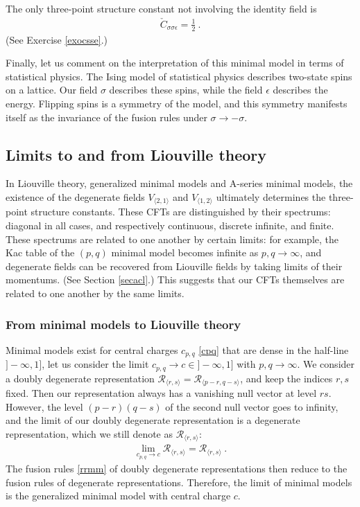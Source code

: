 \documentclass[12pt, a4paper, notitlepage, twoside]{report}
\numberwithin{equation}{section}
\theoremstyle{break}
\begin{document}
The only three-point structure constant not involving the identity field is 
\begin{align}
 \check{C}_{\sigma\sigma\epsilon} =\frac12\ .
\label{csse}
\end{align}
(See Exercise \ref{exocsse}.)

Finally, let us comment on the interpretation of this minimal model in terms of statistical physics.
The Ising model of statistical physics describes two-state spins on a lattice.
Our field $\sigma$ describes these spins, while the field $\epsilon$ describes the energy.
Flipping spins is a symmetry of the model, and this symmetry manifests itself as the invariance of the fusion rules under $\sigma\to -\sigma$. 

\subsection{Limits to and from Liouville theory}\label{secltf}

In Liouville theory, generalized minimal models and A-series minimal models, the existence of the degenerate fields $V_{\langle 2,1\rangle}$ and $V_{\langle 1,2\rangle}$ ultimately determines the three-point structure constants. These CFTs are distinguished by their spectrums: diagonal in all cases, and respectively continuous, discrete infinite, and finite. These spectrums are related to one another by certain limits: for example, the Kac table of the $(p, q)$ minimal model becomes infinite as $p,q\to \infty$, and degenerate fields can be recovered from Liouville fields by taking limits of their momentums. (See Section \ref{secacl}.) This suggests that our CFTs themselves are related to one another by the same limits. 

\subsubsection{From minimal models to Liouville theory}

Minimal models exist for central charges $c_{p,q}$ \eqref{cpq} that are dense in the half-line $]-\infty, 1]$, let us consider the limit $c_{p, q}\to c\in ]-\infty, 1]$ with $p,q\to\infty$.
We consider a doubly degenerate representation $\mathcal{R}_{\langle r,s\rangle}=\mathcal{R}_{\langle p-r,q-s\rangle}$, and keep the indices $r,s$ fixed. 
Then our representation always has a vanishing null vector at level $rs$. However, the level $(p-r)(q-s)$ of the second null vector goes to infinity, and the limit of our doubly degenerate representation is a degenerate representation, which we still denote as $\mathcal{R}_{\langle r,s\rangle}$:
 \begin{align}
  \lim_{c_{p,q}\to c} \mathcal{R}_{\langle r,s\rangle} = \mathcal{R}_{\langle r,s\rangle} \ .
 \end{align}
The fusion rules \eqref{rrmm} of doubly degenerate representations then reduce to the fusion rules of degenerate representations. Therefore, the limit of minimal models is the generalized minimal model with central charge $c$. 
\end{document}
